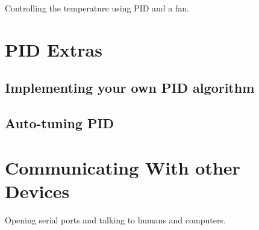 \documentclass[11pt,a4paper]{article}
\begin{document}
Controlling the temperature using PID and a fan.


\section{PID Extras} %
\label{sec:pid_extras}

\subsection{Implementing your own PID algorithm} %
\label{sub:implementing_your_own_pid_algorithm}

\subsection{Auto-tuning PID} %
\label{sub:auto-tuning_pid}




\section{Communicating With other Devices} %
\label{sec:communicating_with_other_devices}

Opening serial ports and talking to humans and computers.


 
 \nocite{*}
\end{document}
